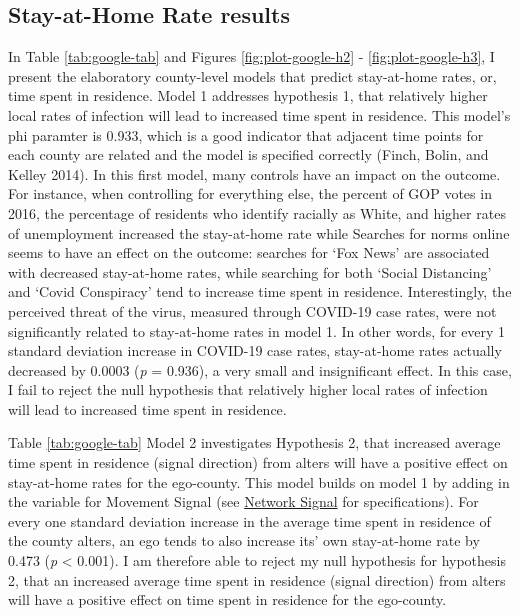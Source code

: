\hypertarget{stay-at-home-rate-results}{%
\subsection{Stay-at-Home Rate results}\label{stay-at-home-rate-results}}




In Table \ref{tab:google-tab} and Figures \ref{fig:plot-google-h2} -
\ref{fig:plot-google-h3}, I present the elaboratory county-level models that
predict stay-at-home rates, or, time spent in residence. Model 1 addresses
hypothesis 1, that relatively higher local rates of infection will lead to
increased time spent in residence. This model's phi paramter is 0.933, which is
a good indicator that adjacent time points for each county are related and the
model is specified correctly (Finch, Bolin, and Kelley 2014). In this first model, many controls
have an impact on the outcome. For instance, when controlling for everything
else, the percent of GOP votes in 2016, the percentage of residents who identify
racially as White, and higher rates of unemployment increased the stay-at-home
rate while Searches for norms online seems to
have an effect on the outcome: searches for `Fox News' are associated with
decreased stay-at-home rates, while searching for both `Social Distancing' and
`Covid Conspiracy' tend to increase time spent in residence. Interestingly, the
perceived threat of the virus, measured through COVID-19 case rates, were not
significantly related to stay-at-home rates in model 1. In other words, for
every 1 standard deviation increase in COVID-19 case rates, stay-at-home rates
actually decreased by
0.0003 (\emph{p} = 0.936),
a very small and insignificant effect. In this case, I fail to reject the null
hypothesis that relatively higher local rates of infection will lead to
increased time spent in residence.

Table \ref{tab:google-tab} Model 2 investigates Hypothesis 2, that increased
average time spent in residence (signal direction) from alters will have a
positive effect on stay-at-home rates for the ego-county. This model builds on
model 1 by adding in the variable for Movement Signal (see \protect\hyperlink{network-signal}{Network
Signal} for specifications). For every one standard deviation
increase in the average time spent in residence of the county alters, an ego tends to also increase its' own stay-at-home rate by
0.473
(\emph{p} \textless{} 0.001). I am therefore able to reject my null hypothesis for hypothesis
2, that an increased average time spent in residence (signal direction) from
alters will have a positive effect on time spent in residence for the
ego-county.

